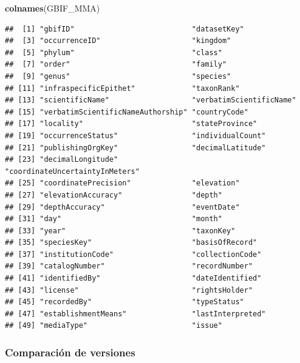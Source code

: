 \documentclass[sn-apa,pdflatex]{sn-jnl}
\newenvironment{Shaded}{\begin{snugshade}}{\end{snugshade}}
\newcommand{\FunctionTok}[1]{\textcolor[rgb]{0.13,0.29,0.53}{\textbf{#1}}}
\newcommand{\NormalTok}[1]{#1}
\begin{document}
\begin{Shaded}
\begin{Highlighting}[]
\FunctionTok{colnames}\NormalTok{(GBIF\_MMA)}
\end{Highlighting}
\end{Shaded}

\begin{verbatim}
##  [1] "gbifID"                           "datasetKey"                      
##  [3] "occurrenceID"                     "kingdom"                         
##  [5] "phylum"                           "class"                           
##  [7] "order"                            "family"                          
##  [9] "genus"                            "species"                         
## [11] "infraspecificEpithet"             "taxonRank"                       
## [13] "scientificName"                   "verbatimScientificName"          
## [15] "verbatimScientificNameAuthorship" "countryCode"                     
## [17] "locality"                         "stateProvince"                   
## [19] "occurrenceStatus"                 "individualCount"                 
## [21] "publishingOrgKey"                 "decimalLatitude"                 
## [23] "decimalLongitude"                 "coordinateUncertaintyInMeters"   
## [25] "coordinatePrecision"              "elevation"                       
## [27] "elevationAccuracy"                "depth"                           
## [29] "depthAccuracy"                    "eventDate"                       
## [31] "day"                              "month"                           
## [33] "year"                             "taxonKey"                        
## [35] "speciesKey"                       "basisOfRecord"                   
## [37] "institutionCode"                  "collectionCode"                  
## [39] "catalogNumber"                    "recordNumber"                    
## [41] "identifiedBy"                     "dateIdentified"                  
## [43] "license"                          "rightsHolder"                    
## [45] "recordedBy"                       "typeStatus"                      
## [47] "establishmentMeans"               "lastInterpreted"                 
## [49] "mediaType"                        "issue"
\end{verbatim}

\subsubsection{Comparación de
versiones}\label{comparaciuxf3n-de-versiones}
\end{document}
